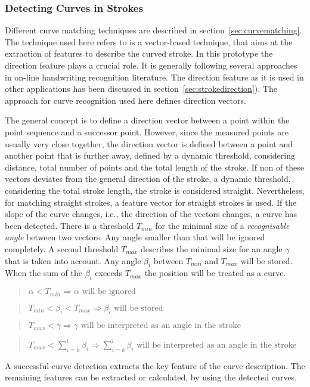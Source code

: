 \subsubsection{Detecting Curves in Strokes}
\label{sec:hwre:detectingcurvesinstrokes}

Different curve matching techniques are described in 
section~\ref{sec:curvematching}. The technique used here refers to is a 
vector-based technique, that aims at the extraction of features to describe
the curved stroke. In this prototype the direction feature plays a crucial role.
It is generally following several approaches in on-line handwriting recognition
literature. The direction feature as it is used in other applications has been
discussed in section~\ref{sec:strokedirection}). The approach for curve
recognition used here defines direction vectors.

The general concept is to define a direction vector between a point
within the point sequence and a successor point.
However, since the measured points are usually very close together, 
the direction vector is defined between a point and another point that 
is further away, defined by a dynamic threshold, considering distance,
total number of points and the total length of the stroke.
If non of these vectors deviates from the general direction of the stroke,
a dynamic threshold, considering the total stroke length,
the stroke is considered straight. Nevertheless, for matching straight strokes,
a feature vector for straight strokes is used.
If the slope of the curve changes, i.e., the direction of the vectors changes, 
a curve has been detected. 
There is a threshold \( T_{min} \) for the minimal size of a 
\emph{recognisable angle} between two vectors. Any angle smaller than that will 
be ignored completely. A second threshold \( T_{max} \) describes the minimal size
for an angle \( \gamma \)  that is taken into account.
Any angle \( \beta_{i} \) between \( T_{min} \) and \( T_{max} \) will be stored. 
When the sum of the \( \beta_{i} \) exceeds \( T_{max} \) the position will be 
treated as a curve.

\begin{quote}
\(
  \alpha < T_{min} \Rightarrow \alpha \text{ will be ignored}
\)
\end{quote}
\begin{quote}
\(
  T_{min} < \beta_{i} < T_{max} \Rightarrow \beta_{i} \text{ will be stored}
\)
\end{quote}
\begin{quote}
\(
  T_{max} < \gamma \Rightarrow 
                  \gamma \text{ will be interpreted as an angle in the stroke}
\)
\end{quote}
\begin{quote}
\(
  T_{max} < \sum\limits_{i=k}^{l} \beta_{i} \Rightarrow 
                               \sum\limits_{i=k}^{l} \beta_{i}
                               \text{ will be interpreted as an 
                               angle in the stroke}
\)
\end{quote}
A successful curve detection extracts the key feature of the curve 
description. The remaining features can be extracted or calculated,
by using the detected curves.


